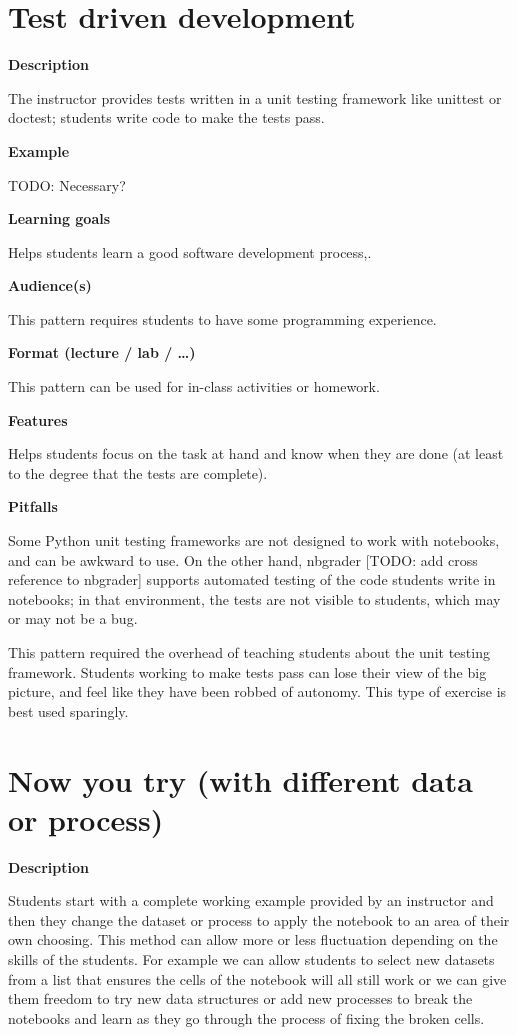 \documentclass[]{book}
\begin{document}
\section{Test driven development}\label{test-driven-development}

\textbf{Description}

The instructor provides tests written in a unit testing framework like
unittest or doctest; students write code to make the tests pass.

\textbf{Example}

TODO: Necessary?

\textbf{Learning goals}

Helps students learn a good software development process,.

\textbf{Audience(s)}

This pattern requires students to have some programming experience.

\textbf{Format (lecture / lab / \ldots{})}

This pattern can be used for in-class activities or homework.

\textbf{Features}

Helps students focus on the task at hand and know when they are done (at
least to the degree that the tests are complete).

\textbf{Pitfalls}

Some Python unit testing frameworks are not designed to work with
notebooks, and can be awkward to use. On the other hand, nbgrader
{[}TODO: add cross reference to nbgrader{]} supports automated testing
of the code students write in notebooks; in that environment, the tests
are not visible to students, which may or may not be a bug.

This pattern required the overhead of teaching students about the unit
testing framework. Students working to make tests pass can lose their
view of the big picture, and feel like they have been robbed of
autonomy. This type of exercise is best used sparingly.

\section{Now you try (with different data or
process)}\label{now-you-try-with-different-data-or-process}

\textbf{Description}

Students start with a complete working example provided by an instructor
and then they change the dataset or process to apply the notebook to an
area of their own choosing. This method can allow more or less
fluctuation depending on the skills of the students. For example we can
allow students to select new datasets from a list that ensures the cells
of the notebook will all still work or we can give them freedom to try
new data structures or add new processes to break the notebooks and
learn as they go through the process of fixing the broken cells.
\end{document}
